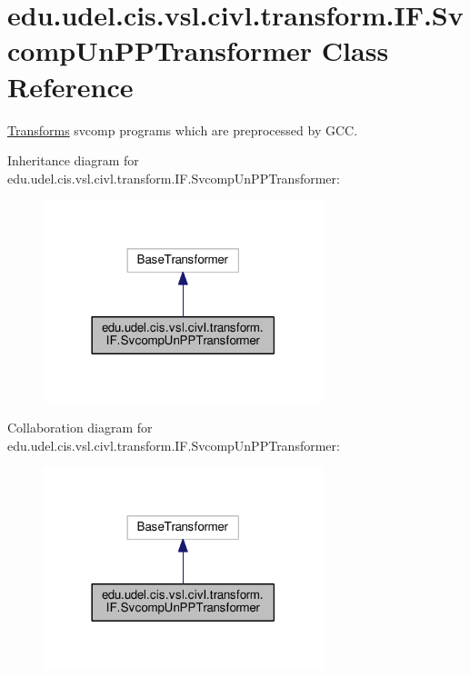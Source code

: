 \hypertarget{classedu_1_1udel_1_1cis_1_1vsl_1_1civl_1_1transform_1_1IF_1_1SvcompUnPPTransformer}{}\section{edu.\+udel.\+cis.\+vsl.\+civl.\+transform.\+I\+F.\+Svcomp\+Un\+P\+P\+Transformer Class Reference}
\label{classedu_1_1udel_1_1cis_1_1vsl_1_1civl_1_1transform_1_1IF_1_1SvcompUnPPTransformer}


\hyperlink{classedu_1_1udel_1_1cis_1_1vsl_1_1civl_1_1transform_1_1IF_1_1Transforms}{Transforms} svcomp programs which are preprocessed by G\+C\+C.  




Inheritance diagram for edu.\+udel.\+cis.\+vsl.\+civl.\+transform.\+I\+F.\+Svcomp\+Un\+P\+P\+Transformer\+:
\nopagebreak
\begin{figure}[H]
\begin{center}
\leavevmode
\includegraphics[width=230pt]{classedu_1_1udel_1_1cis_1_1vsl_1_1civl_1_1transform_1_1IF_1_1SvcompUnPPTransformer__inherit__graph}
\end{center}
\end{figure}


Collaboration diagram for edu.\+udel.\+cis.\+vsl.\+civl.\+transform.\+I\+F.\+Svcomp\+Un\+P\+P\+Transformer\+:
\nopagebreak
\begin{figure}[H]
\begin{center}
\leavevmode
\includegraphics[width=230pt]{classedu_1_1udel_1_1cis_1_1vsl_1_1civl_1_1transform_1_1IF_1_1SvcompUnPPTransformer__coll__graph}
\end{center}
\end{figure}
